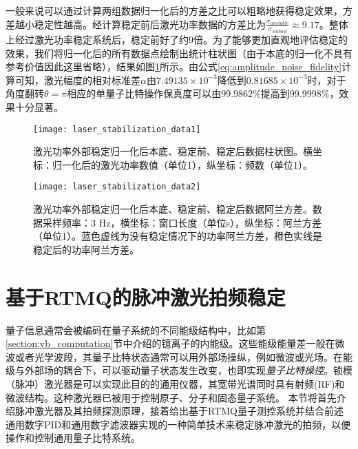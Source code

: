 一般来说可以通过计算两组数据归一化后的方差之比可以粗略地获得稳定效果，方差越小稳定性越高。经计算稳定前后激光功率数据的方差比为$\frac{\sigma_{unstable}}{\sigma_{stabled}}\approx 9.17$。整体上经过激光功率稳定系统后，稳定前好了约9倍。为了能够更加直观地评估稳定的效果，我们将归一化后的所有数据点绘制出统计柱状图（由于本底的归一化不具有参考价值因此这里省略），结果如图\ref{fig:laser_stabilization_data1}所示。由公式\eqref{eq:amplitude_noise_fidelity}计算可知，激光幅度的相对标准差$\alpha$由$7.49135\times 10^{-3}$降低到$0.81685\times 10^{-3}$时，对于角度翻转$\theta=\pi$相应的单量子比特操作保真度可以由$99.9862\%$提高到$99.9998\%$，效果十分显著。


\begin{figure}
    \centering
    \caption[激光功率外部稳定柱状图对比数据]{激光功率外部稳定归一化后本底、稳定前、稳定后数据柱状图。横坐标：归一化后的激光功率数值（单位1），纵坐标：频数（单位1）。\label{fig:laser_stabilization_data1}}
    \texttt{[image: laser\_stabilization\_data1]}
\end{figure}


\begin{figure}
    \centering
    \caption[激光功率外部稳定阿兰方差对比数据]{激光功率外部稳定归一化后本底、稳定前、稳定后数据阿兰方差。数据采样频率：3 Hz，横坐标：窗口长度（单位s），纵坐标：阿兰方差（单位1）。蓝色虚线为没有稳定情况下的功率阿兰方差，橙色实线是稳定后的功率阿兰方差。\label{fig:laser_stabilization_data2}}
    \texttt{[image: laser\_stabilization\_data2]}
\end{figure}









\newpage
\section[基于RTMQ的脉冲激光拍频稳定]{基于RTMQ的脉冲激光拍频稳定\label{section:pulsed_laser_locking}}

量子信息通常会被编码在量子系统的不同能级结构中，比如第\ref{section:yb_computation}节中介绍的镱离子的内能级。这些能级能量差一般在微波或者光学波段，其量子比特状态通常可以用外部场操纵，例如微波或光场。在能级与外部场的耦合下，可以驱动量子状态发生改变，也即实现\emph{量子比特操控}。锁模（脉冲）激光器是可以实现此目的的通用仪器，其宽带光谱同时具有射频(RF)和微波结构。这种激光器已被用于控制原子\cite[]{Hayes_Matsukevich_Maunz_Hucul_Quraishi_Olmschenk_Campbell_Mizrahi_Senko_Monroe_2010}、分子\cite[]{Peer_Shapiro_Stowe_Shapiro_Ye_2007}和固态量子系统\cite[]{Greve_Press_McMahon_Yamamoto_2013}。
本节将首先介绍脉冲激光器及其拍频探测原理，接着给出基于RTMQ量子测控系统并结合前述通用数字PID和通用数字滤波器实现的一种简单技术来稳定脉冲激光的拍频，以便操作和控制通用量子比特系统\cite[]{ladd2010quantum}。


